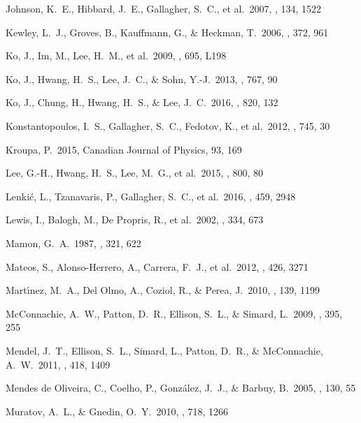 \documentclass[12pt,preprint,apj]{emulateapj}
\begin{document}
\begin{thebibliography}{}
 Johnson, K.~E., Hibbard, J.~E., Gallagher, S.~C., et al.\ 2007, \aj, 134, 1522 

 Kewley, L.~J., Groves, B., Kauffmann, G., \& Heckman, T.\ 2006, \mnras, 372, 961

 Ko, J., Im, M., Lee, H.~M., et al.\ 2009, \apjl, 695, L198

 Ko, J., Hwang, H.~S., Lee, J.~C., \& Sohn, Y.-J.\ 2013, \apj, 767, 90

 Ko, J., Chung, H., Hwang, H.~S., \& Lee, J.~C.\ 2016, \apj, 820, 132 

 Konstantopoulos, I.~S., Gallagher, S.~C., Fedotov, K., et al.\ 2012, \apj, 745, 30

 Kroupa, P.\ 2015, Canadian Journal of Physics, 93, 169 

 Lee, G.-H., Hwang, H.~S., 
Lee, M.~G., et al.\ 2015, \apj, 800, 80 

 Lenki{\'c}, L., Tzanavaris, P., Gallagher, S.~C., et al.\ 2016, \mnras, 459, 2948

 Lewis, I., Balogh, M., De Propris, R., et al.\ 2002, \mnras, 334, 673 

 Mamon, G.~A.\ 1987, \apj, 321, 622 

 Mateos, S., Alonso-Herrero, A., Carrera, F.~J., et al.\ 2012, \mnras, 426, 3271 

 Mart{\'{\i}}nez, M.~A., Del Olmo, A., Coziol, R., \& Perea, J.\ 2010, \aj, 139, 1199 

 McConnachie, A.~W., 
Patton, D.~R., Ellison, S.~L., \& Simard, L.\ 2009, \mnras, 395, 255

 Mendel, J.~T., Ellison, 
S.~L., Simard, L., Patton, D.~R., \& McConnachie, A.~W.\ 2011, \mnras, 418, 1409

 Mendes de 
Oliveira, C., Coelho, P., Gonz{\'a}lez, J.~J., 
\& Barbuy, B.\ 2005, \aj, 130, 55

 Muratov, A.~L., \& Gnedin, O.~Y.\ 2010, \apj, 718, 1266 


\end{thebibliography}
\end{document}
